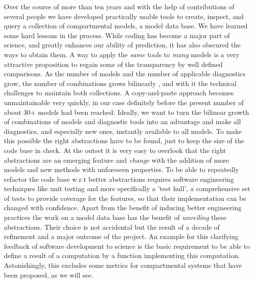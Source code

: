Over the course of more than ten years and with the help of contributions of
several people we have developed practically usable tools to create, inspect,
and query a collection of compartmental models, \ie a model data base.  We
have learned some hard lessons in the process. While coding has become a major
part of science, and greatly enhances our ability of prediction, it has also
obscured the ways to obtain them.   A way to apply the \emph{same} tools to
\emph{many} models is a very attractive proposition to regain some of the
transparency by well defined comparisons.  As the number of models and the
number of applicable diagnostics grow, the number of combinations grows
bilinearly , and with it the technical challenges to maintain both collections.
A copy-and-paste approach becomes unmaintainable very quickly, in our case
definitely before the present number of about 30+ models had been reached.
Ideally, we want to turn the bilinear  growth of combinations of models and
diagnostic tools into an advantage and make all diagnostics, and especially new ones, instantly
available to all models.  To make this possible the right abstractions have to be found, just to
keep the size of the code base in check.  At the outset it is very easy to
overlook that the right abstractions are an emerging feature and \emph{change}
with the addition of more models and new methods with unforeseen properties.  To
be able to repeatedly refactor the code base w.r.t better abstractions requires
software engineering techniques like unit testing and more specifically a 'test
hull', \ie a comprehensive set of tests to provide coverage for the
features, so that their implementation can be changed with confidence.  Apart
from the benefit of inducing better engineering practices the work on a model
data base has the benefit of \emph{unveiling} these abstractions.  Their choice
is not accidental but the result of a decade of refinement and a major outcome
of the project.  An example for this clarifying feedback of software
development to science is the basic requirement to be able to define a
result of a computation by a function implementing this computation.
Astonishingly, this excludes some metrics for compartmental systems that have
been proposed, as we will see.

